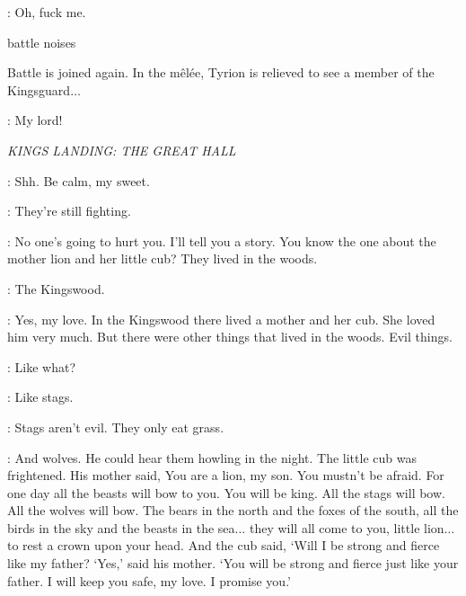 \TYRION:  Oh, fuck me. 

\sfx battle noises

\n Battle is joined again. In the m\^el\'ee, Tyrion is relieved to see a member of the Kingsguard$\ldots$



\PODRICK:  My lord!


\scene

\textit{KINGS LANDING: THE GREAT HALL}


\CERSEI: Shh. Be calm, my sweet. 

\TOMMEN: They're still fighting. 

\CERSEI: No one's going to hurt you. I'll tell you a story. You know the one about the mother lion and her little cub? They lived in the woods. 

\TOMMEN: The Kingswood. 

\CERSEI: Yes, my love. In the Kingswood there lived a mother and her cub. She loved him very much. But there were other things that lived in the woods. Evil things. 

\TOMMEN: Like what? 

\CERSEI: Like stags. 

\TOMMEN: Stags aren't evil. They only eat grass. 

\CERSEI: And wolves. He could hear them howling in the night. The little cub was frightened. His mother said, You are a lion, my son. You mustn't be afraid. For one day all the beasts will bow to you. You will be king. All the stags will bow. All the wolves will bow. The bears in the north and the foxes of the south, all the birds in the sky and the beasts in the sea$\ldots$ they will all come to you, little lion$\ldots$ to rest a crown upon your head. And the cub said, `Will I be strong and fierce like my father? `Yes,' said his mother. `You will be strong and fierce just like your father. I will keep you safe, my love. I promise you.'

